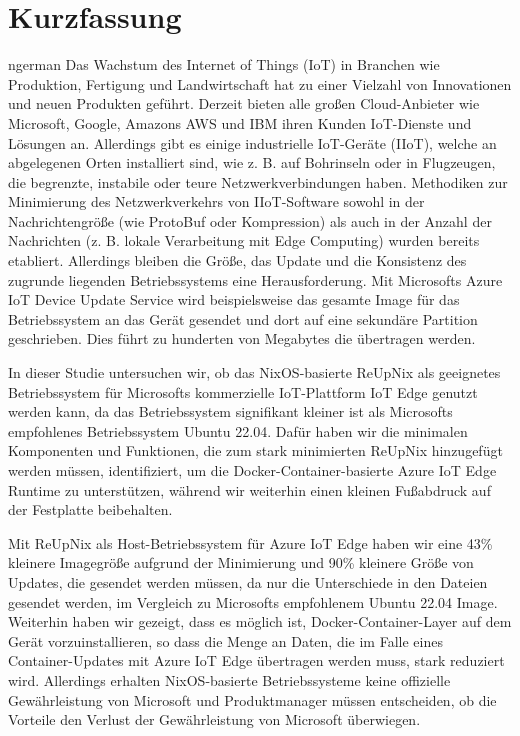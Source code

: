 \chapter*{Kurzfassung}
\begin{otherlanguage*}{ngerman}
Das Wachstum des Internet of Things (IoT) in Branchen wie Produktion, Fertigung
und Landwirtschaft hat zu einer Vielzahl von Innovationen und neuen Produkten geführt.
Derzeit bieten alle großen Cloud-Anbieter wie Microsoft, Google, Amazons AWS und IBM
ihren Kunden IoT-Dienste und Lösungen an.
Allerdings gibt es einige industrielle IoT-Geräte (IIoT), welche
 an abgelegenen Orten installiert sind, wie z. B. auf Bohrinseln oder in Flugzeugen,
die begrenzte, instabile oder teure Netzwerkverbindungen haben.
Methodiken zur Minimierung des Netzwerkverkehrs von IIoT-Software sowohl in der
Nachrichtengröße (wie ProtoBuf oder  Kompression) als auch in der Anzahl der Nachrichten
(z. B. lokale Verarbeitung mit Edge Computing) wurden bereits etabliert.
Allerdings bleiben die Größe, das Update und die Konsistenz des zugrunde liegenden
Betriebssystems eine Herausforderung. Mit Microsofts Azure IoT Device Update Service
wird beispielsweise das gesamte Image für das Betriebssystem an das Gerät gesendet
und dort auf eine sekundäre Partition geschrieben. Dies führt zu hunderten von Megabytes
die übertragen werden.

In dieser Studie untersuchen wir, ob das NixOS-basierte ReUpNix als geeignetes
Betriebssystem für Microsofts kommerzielle IoT-Plattform
IoT Edge genutzt werden kann, da das Betriebssystem signifikant kleiner ist als Microsofts empfohlenes
Betriebssystem Ubuntu 22.04. Dafür haben wir die minimalen Komponenten und Funktionen,
die zum stark minimierten ReUpNix hinzugefügt werden müssen, identifiziert, um die
Docker-Container-basierte Azure IoT Edge Runtime zu unterstützen, während wir
weiterhin einen kleinen Fußabdruck auf der Festplatte beibehalten.

Mit ReUpNix als Host-Betriebssystem für Azure IoT Edge haben wir eine 43\%
kleinere Imagegröße aufgrund der Minimierung und 90\% kleinere Größe von
Updates, die gesendet werden müssen, da nur die Unterschiede in den Dateien gesendet
werden, im Vergleich zu Microsofts empfohlenem Ubuntu 22.04 Image. Weiterhin haben
wir gezeigt, dass es möglich ist, Docker-Container-Layer auf dem Gerät vorzuinstallieren,
so dass die Menge an Daten, die im Falle eines Container-Updates mit Azure IoT Edge
übertragen werden muss, stark reduziert wird. Allerdings erhalten NixOS-basierte
Betriebssysteme keine offizielle Gewährleistung von Microsoft und Produktmanager
müssen entscheiden, ob die Vorteile den Verlust der Gewährleistung von Microsoft überwiegen.

\end{otherlanguage*}
